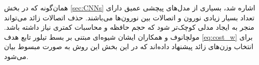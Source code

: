 \documentclass[11pt, twoside]{imsproc}
\begin{document}
%

همان‌گونه که در بخش
\ref{sec:CNNs}
 اشاره شد، بسیاری از مدل‌های پیچشی عمیق دارای تعداد بسیار زیادی نورون و اتصالات بین نورون‌ها می‌باشند.
حذف اتصالات زائد می‌تواند منجر به ایجاد مدلی کوچک‌تر شود که حجم حافظه و محاسبات کمتری نیاز داشته باشد.
مولچانوف و همکاران ایشان
شیوه‌ای مبتنی بر بسط تیلور تابع هدف
\eqref{eq:cost_w}
برای انتخاب وزن‌های زائد پیشنهاد داده‌اند
\cite{MolchanovTKAK17}
  که در این بخش این روش به صورت مبسوط بیان می‌شود.
\end{document}
